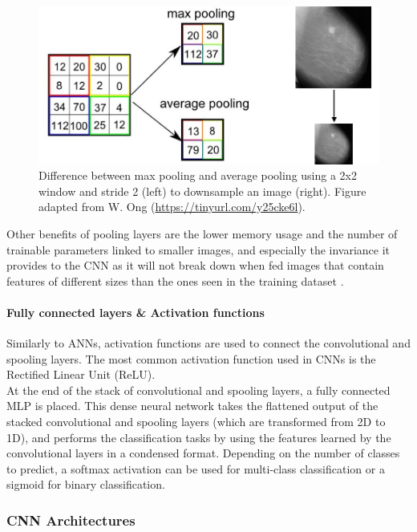 \begin{figure}[ht]
\centerline{\includegraphics[width=\textwidth]{figures/litsurvey/max-vs-avg-pooling.png}}
\caption{\label{fig:litsurvey-max-vs-avg-pooling}Difference between max pooling and average pooling using a 2x2 window and stride 2 (left) to downsample an image (right). Figure adapted from W. Ong (\url{https://tinyurl.com/y25cke6l}).}
\end{figure}

Other benefits of pooling layers are the lower memory usage and the number of trainable parameters linked to smaller images, and especially the invariance it provides to the CNN as it will not break down when fed images that contain features of different sizes than the ones seen in the training dataset \citep{Shen2017}.

\paragraph{Fully connected layers \& Activation functions}

Similarly to ANNs, activation functions are used to connect the convolutional and spooling layers. The most common activation function used in CNNs is the Rectified Linear Unit (ReLU).\\

At the end of the stack of convolutional and spooling layers, a fully connected MLP is placed. This dense neural network takes the flattened output of the stacked convolutional and spooling layers (which are transformed from 2D to 1D), and performs the classification tasks by using the features learned by the convolutional layers in a condensed format. Depending on the number of classes to predict, a softmax activation can be used for multi-class classification or a sigmoid for binary classification.

\subsubsection{CNN Architectures}

